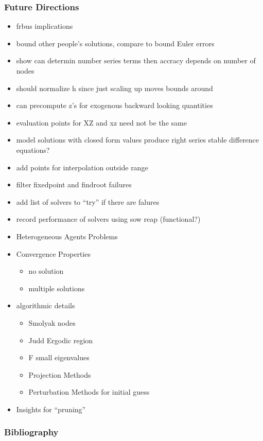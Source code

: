 \documentclass[tikz]{beamer}
\begin{document}

\begin{frame}
  \frametitle{Future Directions}
  \begin{itemize}
  \item frbus implications
  \item bound other people's solutions, compare to bound Euler errors
  \item show can determin number series terms then accracy depends on number of nodes
  \item should normalize h since just scaling up moves bounds around
  \item can precompute z's for exogenous backward looking quantities
  \item evaluation points for XZ and xz need not be the same
  \item model solutions with closed form values produce right series stable difference equations?
  \item add points for interpolation outside range
  \item filter fixedpoint and findroot failures
  \item add list of solvers to ``try'' if there are falures
  \item record performance of solvers using sow reap (functional?)
  \item Heterogeneous Agents Problems
  \item Convergence Properties
    \begin{itemize}
    \item no solution
    \item multiple solutions
    \end{itemize}
\item algorithmic details
  \begin{itemize}
 \item Smolyak nodes
 \item Judd Ergodic region
 \item F small eigenvalues
 \item Projection Methods
 \item Perturbation Methods for initial guess
  \end{itemize}
\item Insights for ``pruning''
  \end{itemize}
\end{frame}

\begin{frame}
  \frametitle{Bibliography}
  


\end{frame}

\appendix
\end{document}
